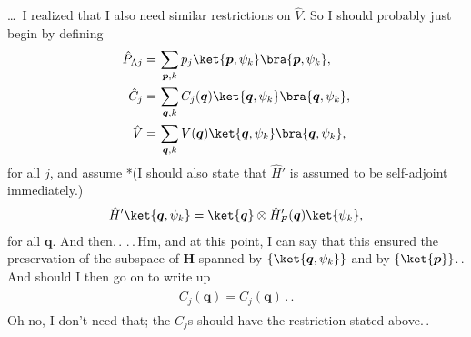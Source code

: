 \documentclass{report}
\begin{document}
\ldots\ I realized that I also need similar restrictions on $\hat V$. So I should probably just begin by defining
\begin{align}
\begin{aligned}
	\hat P_{\Lambda j} =&\, \sum_{\boldsymbol{p}, k} p_j 
		\ket{\boldsymbol{p}, \psi_{k}} \bra{\boldsymbol{p}, \psi_{k}}, \\
	\hat C_{j} =&\, \sum_{\boldsymbol{q}, k} 
		C_j(\boldsymbol{q}) \ket{\boldsymbol{q}, \psi_{k}} \bra{\boldsymbol{q}, \psi_{k}}, \\
	\hat V =&\, \sum_{\boldsymbol{q}, k} 
		V(\boldsymbol{q}) \ket{\boldsymbol{q}, \psi_{k}} \bra{\boldsymbol{q}, \psi_{k}},
	\label{P_C_V_01}
\end{aligned}
\end{align} 
for all $j$, and %
assume 
*(I should also state that $\hat H'$ is assumed to be self-adjoint immediately.)
\begin{align}
\begin{aligned}
	\hat H' \ket{\boldsymbol{q}, \psi_{k}} = 
		\ket{\boldsymbol{q}} \otimes \hat H_F'(\boldsymbol{q}) \ket{\psi_{k}},
	\label{H'_01}
\end{aligned}
\end{align}
for all $\boldsymbol{q}$. And then.\,. .\,.\,Hm, and at this point, I can say that this ensured the preservation of the subspace of \textbf{H} spanned by $\{\ket{\boldsymbol{q}, \psi_{k}}\}$ and by $\{\ket{\boldsymbol{p}}\}$.\,. And should I then go on to write up
\begin{align}
\begin{aligned}
	C_j(\boldsymbol{q}) = C_j(\boldsymbol{q})\,.\,.
\end{aligned}
\end{align}
Oh no, I don't need that; the $C_j$s should have the restriction stated above.\,. 
\end{document}
